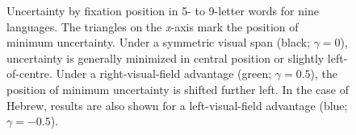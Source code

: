 \documentclass[doc,biblatex]{apa7}
\begin{document}
\printbibliography


\appendix
\renewcommand\thefigure{S\arabic{figure}}
\setcounter{figure}{0}
\renewcommand\thetable{S\arabic{table}}
\setcounter{table}{0}


\begin{figure}
\vspace*{2pt}
\caption{Uncertainty by fixation position in 5- to 9-letter words for nine languages. The triangles on the \textit{x}-axis mark the position of minimum uncertainty. Under a symmetric visual span (black; $\gamma=0$), uncertainty is generally minimized in central position or slightly left-of-centre. Under a right-visual-field advantage (green; $\gamma=0.5$), the position of minimum uncertainty is shifted further left. In the case of Hebrew, results are also shown for a left-visual-field advantage (blue; $\gamma=-0.5$).}
\label{supp1}
\end{figure}
\end{document}

